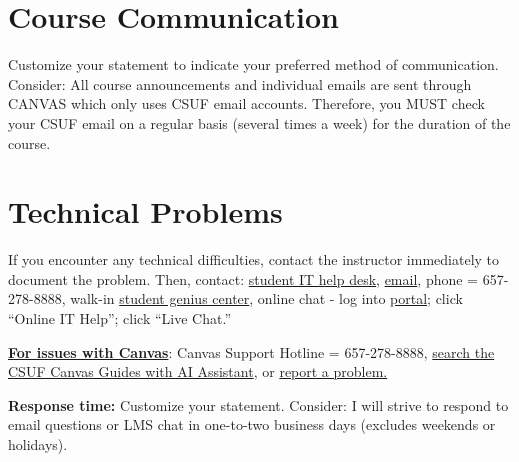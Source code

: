 \documentclass[12pt]{article}
\begin{document}

\section*{Course Communication}

{\color{annotationblue}Customize your statement to indicate your preferred method of communication.} {\color{suggestionred}Consider: All course announcements and individual emails are sent through CANVAS which only uses CSUF email accounts. Therefore, you MUST check your CSUF email on a regular basis (several times a week) for the duration of the course.}

\section*{Technical Problems}

{\color{suggestionred}If you encounter any technical difficulties, contact the instructor immediately to document the problem. Then, contact: \href{https://www.fullerton.edu/it/services/helpdesk/}{student IT help desk}, \href{mailto:StudentITHelpDesk@fullerton.edu}{email}, phone = 657-278-8888, walk-in \href{http://www.fullerton.edu/it/students/sgc/index.php}{student genius center}, online chat - log into \href{http://my.fullerton.edu}{portal}; click ``Online IT Help''; click ``Live Chat.''}

\vspace{0.5em}

\noindent \textbf{\underline{For issues with Canvas}}: {\color{suggestionred}Canvas Support Hotline = 657-278-8888, \href{https://canvashelp.fullerton.edu/}{search the CSUF Canvas Guides with AI Assistant}, or \href{https://titans.service-now.com/sp?id=sc_cat_item&sys_id=f88efe80ebea6a10fb7cfcffcad0cdc6&subject=Canvas}{report a problem.}}


\vspace{0.5em}

\noindent \textbf{Response time:} {\color{annotationblue}Customize your statement.} {\color{suggestionred}Consider: I will strive to respond to email questions or LMS chat in one-to-two business days (excludes weekends or holidays).}
\end{document}
